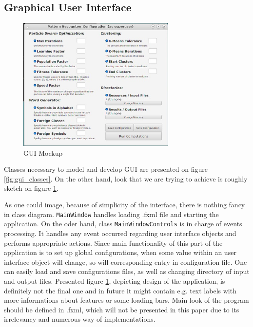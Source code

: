 \documentclass{article}
\begin{document}
%
%
\newpage
\subsection{Graphical User Interface}
\begin{figure}
  \begin{center}
    \includegraphics[width=0.7\textwidth]{images/mock_gui.jpg}
  \end{center}
  \caption{GUI Mockup}
  \label{fig:gui_look}
\end{figure}

Classes necessary to model and develop GUI are presented on figure \ref{fig:gui_classes}. On the other hand, look that we are trying to achieve is roughly sketch on figure \ref{fig:gui_look}.

As one could image, because of simplicity of the interface, there is nothing fancy in class diagram. \texttt{MainWindow} handles loading .fxml file and starting the application. On the oder hand, class \texttt{MainWindowControls} is in charge of events processing. It handles any event occurred regarding user interface objects and performs appropriate actions. Since main functionality of this part of the application is to set up global configurations, when some value within an user interface object will change, so will corresponding entry in configuration file. One can easily load and save configurations files, as well as changing directory of input and output files. Presented figure \ref{fig:gui_look}, depicting design of the application, is definitely not the final one and in future it might contain e.g. text labels with more informations about features or some loading bars. Main look of the program should be defined in .fxml, which will not be presented in this paper due to its irrelevancy and numerous way of implementations. 
\end{document}
